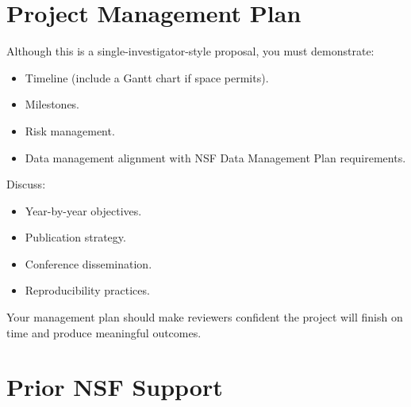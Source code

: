 \documentclass[11pt,letterpaper]{article}
\begin{document}
{%
\section{Project Management Plan}

Although this is a single-investigator-style proposal, you must demonstrate:
\begin{itemize}
    \item Timeline (include a Gantt chart if space permits).
    \item Milestones.
    \item Risk management.
    \item Data management alignment with NSF Data Management Plan requirements.
\end{itemize}
Discuss:
\begin{itemize}
    \item Year-by-year objectives.
    \item Publication strategy.
    \item Conference dissemination.
    \item Reproducibility practices.
\end{itemize}

Your management plan should make reviewers confident the project will finish on time and produce meaningful outcomes.


\section{Prior NSF Support}

}
\end{document}
